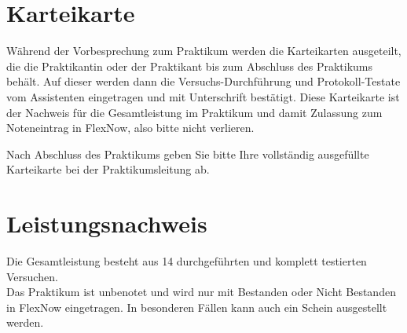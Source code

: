 \section{Karteikarte}

Während der Vorbesprechung zum Praktikum werden die Karteikarten ausgeteilt, die die Praktikantin oder der Praktikant bis zum Abschluss des Praktikums behält. Auf dieser werden dann die Versuchs-Durchführung und Protokoll-Testate vom Assistenten eingetragen und mit Unterschrift bestätigt. Diese Karteikarte ist der Nachweis für die
Gesamtleistung im Praktikum und damit Zulassung zum Noteneintrag in FlexNow, also bitte nicht verlieren.

Nach Abschluss des Praktikums geben Sie bitte Ihre vollständig ausgefüllte Karteikarte bei der Praktikumsleitung ab.


\section{Leistungsnachweis}

Die Gesamtleistung besteht aus 14 durchgeführten und komplett testierten Versuchen. \\
Das Praktikum ist unbenotet und wird nur mit Bestanden oder Nicht Bestanden in FlexNow eingetragen. In besonderen Fällen kann auch ein Schein ausgestellt werden.
